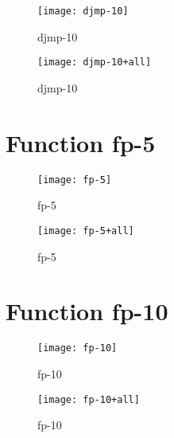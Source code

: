 \begin{center}
\begin{figure}[h]
\centering
\texttt{[image: djmp-10]}
\caption{djmp-10}
\end{figure}
\end{center}

\begin{center}
\begin{figure}[h]
\centering
\texttt{[image: djmp-10+all]}
\caption{djmp-10}
\end{figure}
\end{center}

\newpage

\section{Function fp-5}
\begin{center}

\end{center}

\begin{center}
\begin{figure}[h]
\centering
\texttt{[image: fp-5]}
\caption{fp-5}
\end{figure}
\end{center}

\begin{center}
\begin{figure}[h]
\centering
\texttt{[image: fp-5+all]}
\caption{fp-5}
\end{figure}
\end{center}

\newpage

\section{Function fp-10}
\begin{center}

\end{center}

\begin{center}
\begin{figure}[h]
\centering
\texttt{[image: fp-10]}
\caption{fp-10}
\end{figure}
\end{center}

\begin{center}
\begin{figure}[h]
\centering
\texttt{[image: fp-10+all]}
\caption{fp-10}
\end{figure}
\end{center}

